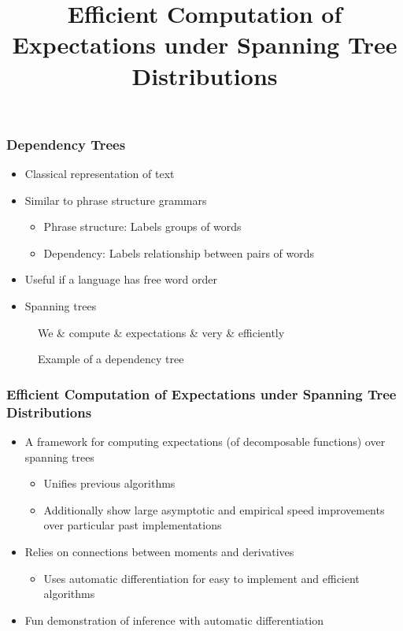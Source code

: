 \documentclass{beamer}
\title{Efficient Computation of Expectations under Spanning Tree Distributions}
\begin{document}
 
\frame{\titlepage}

\begin{frame}
\frametitle{Dependency Trees}

\begin{itemize}
\item Classical representation of text
\item Similar to phrase structure grammars
    \begin{itemize}
    \item Phrase structure: Labels groups of words
    \item Dependency: Labels relationship between pairs of words
    \end{itemize}
\item Useful if a language has free word order
\item Spanning trees
\end{itemize}

\begin{figure}[H]
    \centering
    \begin{dependency}[theme = simple]
    \begin{deptext}[column sep=0.5em]
      We \& compute \& expectations \& very \& efficiently \\
    \end{deptext}
    \end{dependency}
    \caption{Example of a dependency tree}
    \label{fig:deptree}
\end{figure}

\end{frame}

\begin{frame}
\frametitle{Efficient Computation of Expectations under Spanning Tree Distributions}
\begin{itemize}
\item A framework for computing expectations (of decomposable functions) over spanning trees
    \begin{itemize}
    \item Unifies previous algorithms
    \item Additionally show large asymptotic
        and empirical speed improvements over particular past implementations
    \end{itemize}
\item Relies on connections between moments and derivatives
    \begin{itemize}
    \item Uses automatic differentiation for easy to implement and efficient algorithms
    \end{itemize}
\item Fun demonstration of inference with automatic differentiation
\end{itemize}
\end{frame}
\end{document}
